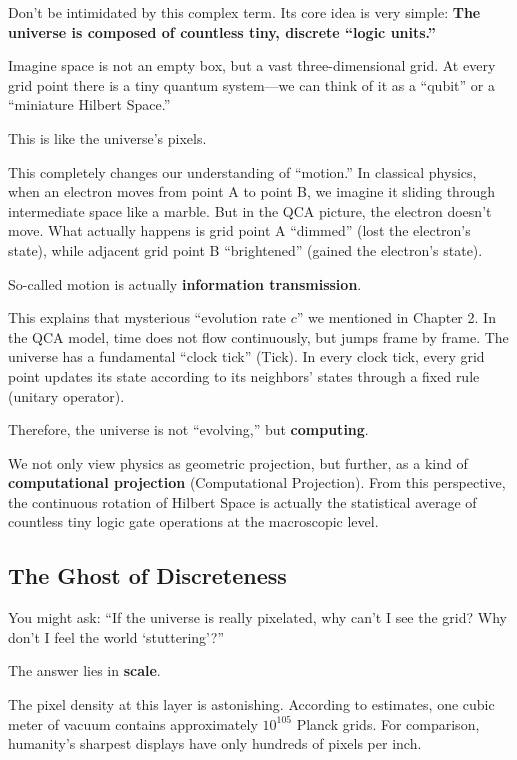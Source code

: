Don't be intimidated by this complex term. Its core idea is very simple: \textbf{The universe is composed of countless tiny, discrete ``logic units.''}

Imagine space is not an empty box, but a vast three-dimensional grid. At every grid point there is a tiny quantum system---we can think of it as a ``qubit'' or a ``miniature Hilbert Space.''

This is like the universe's pixels.

This completely changes our understanding of ``motion.'' In classical physics, when an electron moves from point A to point B, we imagine it sliding through intermediate space like a marble. But in the QCA picture, the electron doesn't move. What actually happens is grid point A ``dimmed'' (lost the electron's state), while adjacent grid point B ``brightened'' (gained the electron's state).

So-called motion is actually \textbf{information transmission}.

This explains that mysterious ``evolution rate $c$'' we mentioned in Chapter 2. In the QCA model, time does not flow continuously, but jumps frame by frame. The universe has a fundamental ``clock tick'' (Tick). In every clock tick, every grid point updates its state according to its neighbors' states through a fixed rule (unitary operator).

Therefore, the universe is not ``evolving,'' but \textbf{computing}.

We not only view physics as geometric projection, but further, as a kind of \textbf{computational projection} (Computational Projection). From this perspective, the continuous rotation of Hilbert Space is actually the statistical average of countless tiny logic gate operations at the macroscopic level.

\subsection{The Ghost of Discreteness}

You might ask: ``If the universe is really pixelated, why can't I see the grid? Why don't I feel the world `stuttering'?''

The answer lies in \textbf{scale}.

The pixel density at this layer is astonishing. According to estimates, one cubic meter of vacuum contains approximately $10^{105}$ Planck grids. For comparison, humanity's sharpest displays have only hundreds of pixels per inch.

